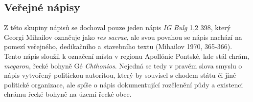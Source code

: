 
\subsection[veřejné-nápisy-2]{Veřejné nápisy}

Z této skupiny nápisů se dochoval pouze jeden nápis {\em IG Bulg} 1,2 398, který Georgi Mihailov označuje jako {\em res sacrae}, ale svou povahou se nápis nachází na pomezí veřejného, dedikačního a stavebního textu (Mihailov 1970, 365-366). Tento nápis sloužil k označení místa v regionu Apollónie Pontské, kde stál chrám, {\em megaron}, řecké bohyně Gé {\em Chthonios}. Nejedná se tedy v pravém slova smyslu o nápis vytvořený politickou autoritou, který by souvisel s chodem státu či jiné politické organizace, ale spíše o nápis dokumentující rozčlenění půdy a existenci chrámu řecké bohyně na území řecké obce.


